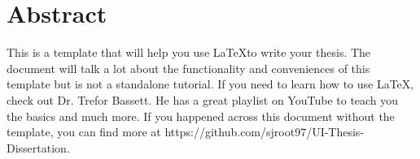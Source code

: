\chapter{Abstract}
This is a template that will help you use \LaTeX to write your thesis. The document will talk a lot about the functionality and conveniences of this template but is not a standalone tutorial. If you need to learn how to use \LaTeX, check out Dr. Trefor Bassett. He has a great playlist on YouTube to teach you the basics and much more. If you happened across this document without the template, you can find more at https://github.com/sjroot97/UI-Thesis-Dissertation.

